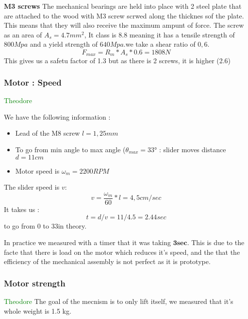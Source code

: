 \documentclass[lettersize,journal]{IEEEtran}
\begin{document}
\textbf{M3 screws}
The mechanical bearings are held into place with 2 steel plate that are attached to the wood with M3 screw scrwed along the thicknes sof the plate. 
This means that they will also receive the maximum ampunt of force. 
The screw as an area of $A_s = 4.7 mm^2$, It class is 8.8 meaning it has a tensile strength of $800Mpa$ and a yield strength of $640 Mpa$.we take a shear ratio of $0,6$. 
\begin{equation*}
    F_{max} = R_m*A_s*0.6 = 1808 N 
\end{equation*}
This gives us a safetu factor of 1.3 but as there is 2 screws, it is higher (2.6)

\bigskip

\subsubsection{Motor : Speed} \textcolor{green}{Theodore}

We have the following information : 
\begin{itemize}
    \item Lead of the M8 screw $l = 1,25 mm$
    \item To go from min angle to max angle ($\theta_{max} = 33°$ : slider moves distance $ d= 11cm$
    \item Motor speed is $\omega_m = 2200 RPM$
\end{itemize}

The slider speed is $v$: 
\begin{equation*}
    v = \frac{\omega_m}{60}*l = 4,5 cm/sec
\end{equation*}
It takes us : 
\begin{equation*}
    t = d/v = 11/4.5 = 2.44 sec
\end{equation*}
to go from 0 to 33\degree in theory.

In practice we measured with a timer that it was taking $\textbf{3sec}$. 
This is due to the facte that there is load on the motor which reduces it's speed, and the that the efficiency of the mechanical assembly is not perfect as it is prototype. 


\bigskip

\subsubsection{Motor strength} \textcolor{green}{Theodore}
The goal of the mecnism is to only lift itself, we measured that it's whole weight is 1.5 kg. 
\end{document}
